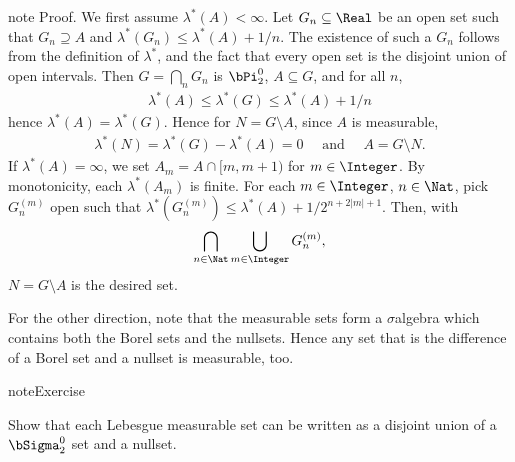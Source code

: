\documentclass[letterpaper,10pt,english]{jupyterBook}
\begin{document}
\begin{sphinxadmonition}{note}
\sphinxAtStartPar
Proof. We first assume \(\lambda^*(A) < \infty\).  Let \(G_n \subseteq \Real\) be an open set such that \(G_n \supseteq A\) and  \(\lambda^*(G_n) \leq \lambda^*(A) + 1/n\). The existence of such a \(G_n\) follows from the definition of \(\lambda^*\), and the fact that every open set is the disjoint union of open intervals.  Then \(G = \bigcap_n G_n\) is \(\bPi^0_2\), \(A \subseteq G\), and for all \(n\),
\begin{equation*}
\begin{split}
    \lambda^*(A) \leq \lambda^*(G) \leq \lambda^*(A) + 1/n  
\end{split}
\end{equation*}
\sphinxAtStartPar
hence \(\lambda^*(A) = \lambda^*(G)\). Hence for \(N = G \setminus A\), since \(A\) is measurable,
\begin{equation*}
\begin{split}
    \lambda^*(N) = \lambda^*(G) - \lambda^*(A)  = 0 \quad \text{ and } \quad A = G \setminus N.
\end{split}
\end{equation*}
\sphinxAtStartPar
If \(\lambda^*(A) = \infty\), we set \(A_m = A \cap [m,m+1)\) for \(m \in \Integer\). By monotonicity, each \(\lambda^*(A_m)\) is finite. For each \(m \in \Integer\), \(n \in \Nat\), pick \(G^{(m)}_n\) open such that \(\lambda^*(G^{(m)}_n) \leq \lambda^*(A) + 1/2^{n+2|m|+1}\). Then, with
\begin{equation*}
\begin{split}
    \bigcap_{n \in \Nat} \bigcup_{m \in \Integer} G^{(m)}_n,
\end{split}
\end{equation*}
\sphinxAtStartPar
\(N = G\setminus A\) is the desired set.

\sphinxAtStartPar
For the other direction, note that the measurable sets form a \(\sigma\)\sphinxhyphen{}algebra which contains both the Borel sets and the nullsets. Hence any set that is the difference of a Borel set and a nullset is measurable, too.
\end{sphinxadmonition}

\begin{sphinxadmonition}{note}{Exercise}

\sphinxAtStartPar
Show that each Lebesgue measurable set can be written as a disjoint union of a \(\bSigma^0_2\) set and a nullset.
\end{sphinxadmonition}
\end{document}
